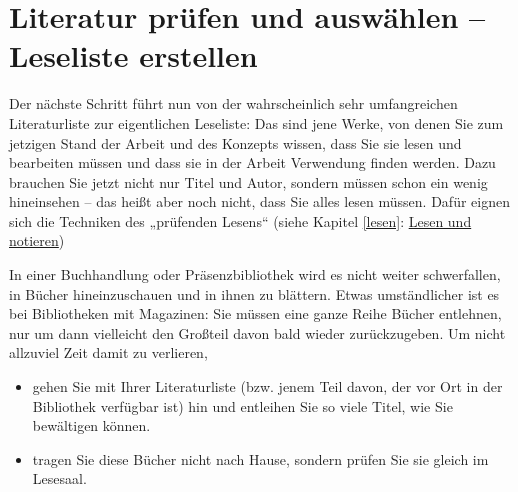 \documentclass[]{book}
\providecommand{\tightlist}{%
  \setlength{\itemsep}{0pt}\setlength{\parskip}{0pt}}
\theoremstyle{definition}
\theoremstyle{definition}
\theoremstyle{definition}
\theoremstyle{remark}
\begin{document}
\section{Literatur prüfen und auswählen -- Leseliste
erstellen}\label{literatur-prufen-und-auswahlen-leseliste-erstellen}

Der nächste Schritt führt nun von der wahrscheinlich sehr umfangreichen
Literaturliste zur eigentlichen Leseliste: Das sind jene Werke, von
denen Sie zum jetzigen Stand der Arbeit und des Konzepts wissen, dass
Sie sie lesen und bearbeiten müssen und dass sie in der Arbeit
Verwendung finden werden. Dazu brauchen Sie jetzt nicht nur Titel und
Autor, sondern müssen schon ein wenig hineinsehen -- das heißt aber noch
nicht, dass Sie alles lesen müssen. Dafür eignen sich die Techniken des
„prüfenden Lesens`` (siehe Kapitel \ref{lesen}:
\protect\hyperlink{lesen}{Lesen und notieren})

In einer Buchhandlung oder Präsenzbibliothek wird es nicht weiter
schwerfallen, in Bücher hineinzuschauen und in ihnen zu blättern. Etwas
umständlicher ist es bei Bibliotheken mit Magazinen: Sie müssen eine
ganze Reihe Bücher entlehnen, nur um dann vielleicht den Großteil davon
bald wieder zurückzugeben. Um nicht allzuviel Zeit damit zu verlieren,

\begin{itemize}
\tightlist
\item
  gehen Sie mit Ihrer Literaturliste (bzw. jenem Teil davon, der vor Ort
  in der Bibliothek verfügbar ist) hin und entleihen Sie so viele Titel,
  wie Sie bewältigen können.
\item
  tragen Sie diese Bücher nicht nach Hause, sondern prüfen Sie sie
  gleich im Lesesaal.
\end{itemize}
\end{document}
